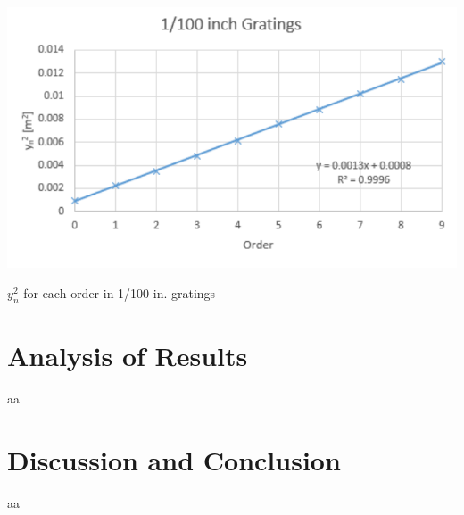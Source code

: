 \documentclass{article}
\begin{document}
\begin{graph}
  \includegraphics[width=\textwidth]{img/100.pdf}
  \caption{$y_{n}^{2}$ for each order in 1/100 in. gratings}
\end{graph}

\section{Analysis of Results}
aa

\section{Discussion and Conclusion}
aa

\printbibliography
\end{document}
